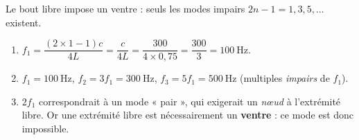 \documentclass[11pt,a4paper]{article}
\begin{document}
\begin{corrige}
Le bout libre impose un ventre : seuls les modes impairs $2n-1=1,3,5,\dots$ existent.
\begin{enumerate}[label=\alph*)]
  \item $f_1=\dfrac{(2\times1-1)c}{4L}=\dfrac{c}{4L}=\dfrac{300}{4\times 0{,}75}=\dfrac{300}{3}=\SI{100}{\hertz}.$
  \item $f_1=\SI{100}{\hertz}$, $f_2=3f_1=\SI{300}{\hertz}$, $f_3=5f_1=\SI{500}{\hertz}$
        (multiples \emph{impairs} de $f_1$).
  \item $2f_1$ correspondrait à un mode « pair », qui exigerait un \emph{nœud} à l'extrémité
        libre. Or une extrémité libre est nécessairement un \textbf{ventre} : ce mode est donc
        impossible.
\end{enumerate}
\end{corrige}
\end{document}
